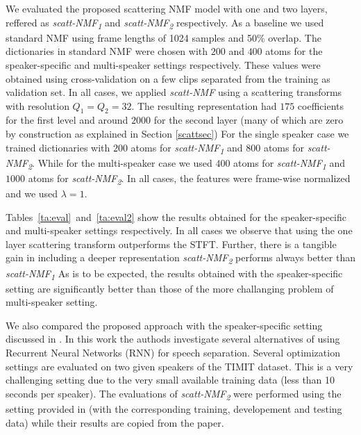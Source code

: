  We evaluated the proposed scattering NMF model with one and two layers, reffered
as \emph{scatt-NMF\textsubscript{1}} and \emph{scatt-NMF\textsubscript{2}} respectively. As a baseline we used standard NMF 
using frame lengths of 1024 samples and 50\% overlap. 
%
The dictionaries in standard NMF were chosen with $200$ and $400$ atoms for the speaker-specific and multi-speaker
settings respectively. These values were obtained using cross-validation on a few clips separated from the training as validation set.
%
In all cases, we applied \emph{scatt-NMF} using a scattering transforms with resolution $Q_1= Q_2 = 32$.
The resulting representation had $175$ coefficients for the first level and around $2000$ for the second layer (many of which are
zero by construction as explained in Section \ref{scattsec})
%
For the single speaker case we trained dictionaries with $200$ atoms for \emph{scatt-NMF\textsubscript{1}}  and $800$ atoms for \emph{scatt-NMF\textsubscript{2}}.
While for the multi-speaker case we used $400$ atoms for \emph{scatt-NMF\textsubscript{1}}  and $1000$ atoms for \emph{scatt-NMF\textsubscript{2}}.
In all cases, the features were frame-wise normalized and we used $\lambda=1$. 
%
%

 Tables~\ref{ta:eval}~and~\ref{ta:eval2} show the results obtained for the speaker-specific and multi-speaker settings respectively.
In all cases we observe that using the one layer scattering transform outperforms the STFT. 
Further, there is a tangible gain in including a deeper representation \emph{scatt-NMF\textsubscript{2}} performs always better than \emph{scatt-NMF\textsubscript{1}} 
As is to be expected, the results obtained with the speaker-specific setting are significantly better than those of the more challanging problem
of multi-speaker setting. 

We also compared the proposed approach with the speaker-specific setting discussed in \cite{Huang_DNN_Separation_ICASSP2014}. In this work
the authods investigate several alternatives of using Recurrent Neural Networks (RNN) for speech separation.
Several optimization settings are evaluated on two given speakers of the TIMIT dataset. This is a very challenging setting
due to the very small available training data (less than 10 seconds per speaker). The evaluations of \emph{scatt-NMF\textsubscript{2}} were performed using the setting provided in \cite{} (with the corresponding training, developement and testing data) while their results are copied from the paper.

